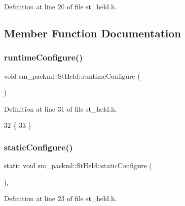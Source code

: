 Definition at line 20 of file st\+\_\+held.\+h.



\subsection{Member Function Documentation}
\mbox{\label{structsm__packml_1_1StHeld_a718472ff6cb7dad6febe341dc8e06302}} 
\subsubsection{\texorpdfstring{runtime\+Configure()}{runtimeConfigure()}}
{\footnotesize\ttfamily void sm\+\_\+packml\+::\+St\+Held\+::runtime\+Configure (\begin{DoxyParamCaption}{ }\end{DoxyParamCaption})\hspace{0.3cm}{\ttfamily [inline]}}



Definition at line 31 of file st\+\_\+held.\+h.


\begin{DoxyCode}
32     \{
33     \}
\end{DoxyCode}
\mbox{\label{structsm__packml_1_1StHeld_a9726a9afc007dbe38e5adcec3df6511e}} 
\subsubsection{\texorpdfstring{static\+Configure()}{staticConfigure()}}
{\footnotesize\ttfamily static void sm\+\_\+packml\+::\+St\+Held\+::static\+Configure (\begin{DoxyParamCaption}{ }\end{DoxyParamCaption})\hspace{0.3cm}{\ttfamily [inline]}, {\ttfamily [static]}}



Definition at line 23 of file st\+\_\+held.\+h.


